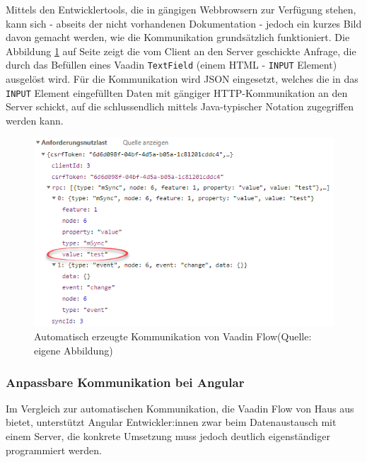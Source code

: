 \documentclass[a4paper,12pt,twoside]{scrreprt}
\begin{document}
\medskip

Mittels den Entwicklertools, die in gängigen Webbrowsern zur Verfügung stehen, kann sich - abseits der nicht vorhandenen Dokumentation - jedoch ein kurzes Bild davon gemacht werden, wie die Kommunikation grundsätzlich funktioniert. Die Abbildung \ref{fig:vaadin-json-communication} auf Seite \pageref{fig:vaadin-json-communication} zeigt die vom Client an den Server geschickte Anfrage, die durch das Befüllen eines Vaadin \texttt{TextField} (einem HTML - \texttt{INPUT} Element) ausgelöst wird. Für die Kommunikation wird \acs{JSON} eingesetzt, welches die in das \texttt{INPUT} Element eingefüllten Daten mit gängiger HTTP-Kommunikation an den Server schickt, auf die schlussendlich mittels Java-typischer Notation zugegriffen werden kann.

\begin{figure}[ht]
    \centering
    \includegraphics[scale=0.75]{images/Luidold_Vaadin-HTTP-communication.png}
    \caption[Automatisch erzeugte Kommunikation von Vaadin Flow]{Automatisch erzeugte Kommunikation von Vaadin Flow\newline(Quelle: eigene Abbildung)}
    \label{fig:vaadin-json-communication}
\end{figure}

\newpage

\subsubsection{Anpassbare Kommunikation bei Angular}
\label{sub-sub-sec:kommunikation-herangehensweise-angular}
Im Vergleich zur automatischen Kommunikation, die Vaadin Flow von Haus aus bietet, unterstützt Angular Entwickler:innen zwar beim Datenaustausch mit einem Server, die konkrete Umsetzung muss jedoch deutlich eigenständiger programmiert werden.
\end{document}
